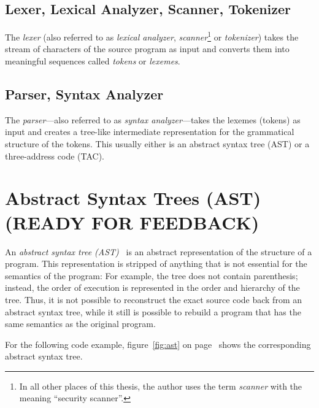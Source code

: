 \subsection{Lexer, Lexical Analyzer, Scanner, Tokenizer}

The \emph{lexer} (also referred to as \emph{lexical analyzer}, \emph{scanner}\footnote{In all other places of this thesis, the author uses the term \emph{scanner} with the meaning ``security scanner''.} or \emph{tokenizer}) takes the stream of characters of the source program as input and converts them into meaningful sequences called \emph{tokens} or \emph{lexemes}.~\cite{compilers, compiler-construction}


\subsection{Parser, Syntax Analyzer}

The \emph{parser}---also referred to as \emph{syntax analyzer}---takes the lexemes (tokens) as input and creates a tree-like intermediate representation for the grammatical structure of the to\-kens. This usually either is an abstract syntax tree (AST) or a three-address code (TAC).~\cite{compilers, compiler-construction}


\section{Abstract Syntax Trees (AST) (READY FOR FEEDBACK)}
\label{ast}

An \emph{abstract syntax tree (AST)}~\cite{compiler-construction} is an abstract representation of the structure of a program. This representation is stripped of anything that is not essential for the semantics of the program: For example, the tree does not contain parenthesis; instead, the order of execution is represented in the order and hierarchy of the tree. Thus, it is not possible to reconstruct the exact source code back from an abstract syntax tree, while it still is possible to rebuild a program that has the same semantics as the original program.

For the following code example, figure~\ref{fig:ast} on page~\pageref{fig:ast} shows the corresponding abstract syntax tree.

